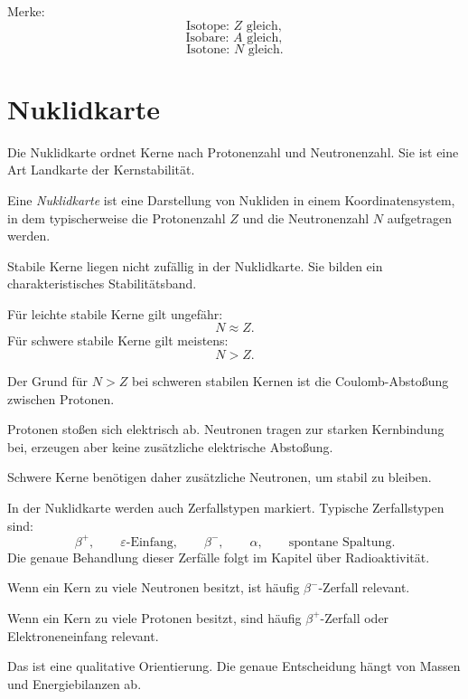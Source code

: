 \begin{examtipbox}
Merke:
\[
    \text{Isotope: } Z \text{ gleich},
\]
\[
    \text{Isobare: } A \text{ gleich},
\]
\[
    \text{Isotone: } N \text{ gleich}.
\]
\end{examtipbox}

\section{Nuklidkarte}

Die Nuklidkarte ordnet Kerne nach Protonenzahl und Neutronenzahl.
Sie ist eine Art Landkarte der Kernstabilität.

\begin{definitionbox}
Eine \emph{Nuklidkarte} ist eine Darstellung von Nukliden in einem Koordinatensystem,
in dem typischerweise die Protonenzahl $Z$ und die Neutronenzahl $N$ aufgetragen werden.
\end{definitionbox}

\begin{conceptbox}
Stabile Kerne liegen nicht zufällig in der Nuklidkarte.
Sie bilden ein charakteristisches Stabilitätsband.

Für leichte stabile Kerne gilt ungefähr:
\[
    N \approx Z.
\]
Für schwere stabile Kerne gilt meistens:
\[
    N > Z.
\]
\end{conceptbox}

\begin{conceptbox}
Der Grund für $N>Z$ bei schweren stabilen Kernen ist die Coulomb-Abstoßung zwischen Protonen.

Protonen stoßen sich elektrisch ab.
Neutronen tragen zur starken Kernbindung bei, erzeugen aber keine zusätzliche elektrische
Abstoßung.

Schwere Kerne benötigen daher zusätzliche Neutronen, um stabil zu bleiben.
\end{conceptbox}

\begin{notebox}
In der Nuklidkarte werden auch Zerfallstypen markiert.
Typische Zerfallstypen sind:
\[
    \beta^+,
    \qquad
    \varepsilon\text{-Einfang},
    \qquad
    \beta^-,
    \qquad
    \alpha,
    \qquad
    \text{spontane Spaltung}.
\]
Die genaue Behandlung dieser Zerfälle folgt im Kapitel über Radioaktivität.
\end{notebox}

\begin{examtipbox}
Wenn ein Kern zu viele Neutronen besitzt, ist häufig $\beta^-$-Zerfall relevant.

Wenn ein Kern zu viele Protonen besitzt, sind häufig $\beta^+$-Zerfall oder
Elektroneneinfang relevant.

Das ist eine qualitative Orientierung. Die genaue Entscheidung hängt von Massen
und Energiebilanzen ab.
\end{examtipbox}

